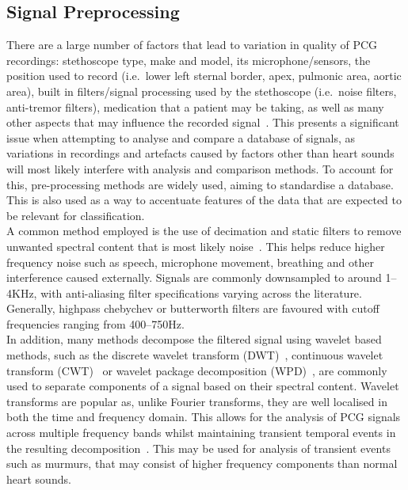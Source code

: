 \documentclass[titlepage, 12pt]{scrartcl} \usepackage{enumitem}
\begin{document}
\subsection{Signal Preprocessing}
There are a large number of factors that lead to variation in quality of PCG
recordings: stethoscope type, make and model, its microphone/sensors, the
position used to record (i.e.\ lower left sternal border, apex, pulmonic area,
aortic area), built in filters/signal processing used by the stethoscope (i.e.\
noise filters, anti-tremor filters), medication that a patient may be taking,
as well as many other aspects that may influence the recorded
signal~\parencite[p.4]{Pavlopoulos2004}. This presents a significant issue when
attempting to analyse and compare a database of signals, as variations in
recordings and artefacts caused by factors other than heart sounds will most
likely interfere with analysis and comparison methods. To account for this,
pre-processing methods are widely used, aiming to standardise a database. This
is also used as a way to accentuate features of the data that are expected to
be relevant for classification.\\

A common method employed is the use of decimation and static filters to remove
unwanted spectral content that is most likely noise~\parencite{Liang1997a,
Homsi2016, Springer2016, Gupta2007}. This helps reduce higher frequency noise
such as speech, microphone movement, breathing and other interference caused
externally. Signals are commonly downsampled to around 1--4KHz, with
anti-aliasing filter specifications varying across the literature. Generally,
highpass chebychev or butterworth filters are favoured with cutoff frequencies
ranging from 400--750Hz.\\

In addition, many methods decompose the filtered signal using wavelet based
methods, such as the discrete wavelet transform (DWT)~\parencite{Liang1997a,
Pavlopoulos2004}, continuous wavelet transform (CWT)~\parencite{Langley2016} or
wavelet package decomposition (WPD)~\parencite{Liang1998}, are commonly used to
separate components of a signal based on their spectral content.
Wavelet transforms are popular as, unlike Fourier transforms, they are well
localised in both the time and frequency domain. This allows for the analysis
of PCG signals across multiple frequency bands whilst maintaining transient
temporal events in the resulting decomposition~\parencite[p.93]{Ari2008}.
This may be used for analysis of transient events such as murmurs, that may
consist of higher frequency components than normal heart sounds.
\end{document}
